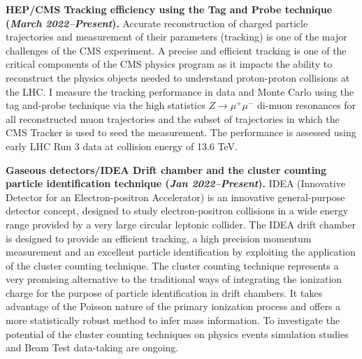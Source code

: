 \documentclass[11pt]{res}
\begin{document}
\begin{resume}
\textbf{HEP/CMS Tracking efficiency using the Tag and Probe technique \textbf{(\textit{March 2022--Present})}.} Accurate reconstruction of charged particle trajectories and measurement of their parameters (tracking) is one of the major challenges of the CMS experiment. A precise and efficient tracking is one of the critical components of the CMS physics program as it impacts the ability to reconstruct the physics objects needed to understand proton-proton collisions at the LHC. I measure the tracking performance in data and Monte Carlo using the tag and-probe technique via the high statistics $Z\to \mu^{+} \mu^{-}$ di-muon resonances for all reconstructed muon trajectories and the subset of trajectories in which the CMS Tracker is used to seed the measurement. The performance is assessed using early LHC Run 3 data at collision energy of 13.6 TeV.

\textbf{Gaseous detectors/IDEA Drift chamber and the cluster counting particle identification technique \textbf{(\textit{Jan 2022--Present})}.} 
IDEA (Innovative Detector for an Electron-positron Accelerator) is an innovative general-purpose detector concept, designed to study electron-positron collisions in a wide energy range provided by a very large circular leptonic collider. The IDEA drift chamber is designed to provide an efficient tracking, a high precision momentum measurement and an excellent particle identification by exploiting the application of the cluster counting technique. The cluster counting technique represents a very promising alternative to the traditional ways of integrating the ionization charge for the purpose of particle identification in drift chambers. It takes advantage of the Poisson nature of the primary ionization process and offers a more statistically robust method to infer mass information. To investigate the potential of the cluster counting techniques on physics events simulation studies and Beam Test data-taking are ongoing.


\end{resume}
\end{document}

